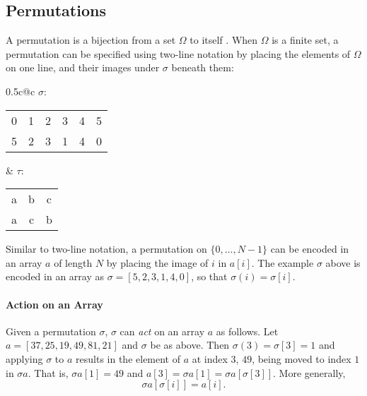 \documentclass{llncs}
\begin{document}
\subsection{Permutations}
\label{perms}

A permutation is a bijection from a set \(\Omega\) to itself \cite{dummitfoote}.
When \(\Omega\) is a finite set, a permutation can be specified using two-line
notation by placing the elements of \(\Omega\) on one line, and their images
under \(\sigma\) beneath them:

\begin{center}
\begin{tabular*}{0.5\textwidth}{c@{\extracolsep{\fill}}c}
\(\sigma\):
\begin{tabular}{c@{\hspace{1em}}c@{\hspace{1em}}c@{\hspace{1em}}c@{\hspace{1em}}c@{\hspace{1em}}c}
0 & 1 & 2 & 3 & 4 & 5\\
5 & 2 & 3 & 1 & 4 & 0
\end{tabular}
&
\(\tau\):
\begin{tabular}{c@{\hspace{1em}}c@{\hspace{1em}}c}
a & b & c\\
a & c & b
\end{tabular}
\end{tabular*}
\end{center}

Similar to two-line notation, a permutation on \(\{0, \dotsc, N-1\}\) can be encoded in an array \(a\) of length \(N\) by placing the image of \(i\) in \(a[i]\).  The example \(\sigma\) above is encoded in an array as \(\sigma = [5, 2, 3, 1, 4, 0]\), so that \(\sigma(i) = \sigma[i]\).


\paragraph{Action on an Array}

Given a permutation \(\sigma\), \(\sigma\) can {\it act} on an array \(a\) as follows.  Let \(a = [37, 25, 19, 49, 81, 21]\) and \(\sigma\) be as above.  Then \(\sigma(3) = \sigma[3] = 1\) and applying \(\sigma\) to \(a\) results in the element of \(a\) at index \(3\), \(49\), being moved to index \(1\) in \(\sigma a\).  That is, \(\sigma a[1] = 49\) and \(a[3] = \sigma a[1] = \sigma a[\sigma[3]]\).  More generally,
\begin{equation}
\sigma a[\sigma[i]] = a[i].%
\label{action}
\end{equation}
\end{document}

